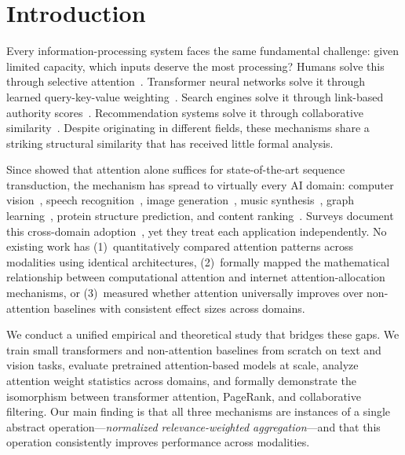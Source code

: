 \section{Introduction}
\label{sec:intro}

Every information-processing system faces the same fundamental challenge: given limited capacity, which inputs deserve the most processing? Humans solve this through selective attention~\citep{simon1971designing}. Transformer neural networks solve it through learned query-key-value weighting~\citep{vaswani2017attention}. Search engines solve it through link-based authority scores~\citep{page1999pagerank}. Recommendation systems solve it through collaborative similarity~\citep{koren2009matrix}. Despite originating in different fields, these mechanisms share a striking structural similarity that has received little formal analysis.

Since \citet{vaswani2017attention} showed that attention alone suffices for state-of-the-art sequence transduction, the mechanism has spread to virtually every AI domain: computer vision~\citep{dosovitskiy2021image}, speech recognition~\citep{radford2022whisper}, image generation~\citep{peebles2023scalable}, music synthesis~\citep{huang2018music}, graph learning~\citep{velickovic2018graph}, protein structure prediction, and content ranking~\citep{linkedin2025ranking}. Surveys document this cross-domain adoption~\citep{brauwers2022survey,guo2022attention}, yet they treat each application independently. No existing work has (1)~quantitatively compared attention patterns across modalities using identical architectures, (2)~formally mapped the mathematical relationship between computational attention and internet attention-allocation mechanisms, or (3)~measured whether attention universally improves over non-attention baselines with consistent effect sizes across domains.

We conduct a unified empirical and theoretical study that bridges these gaps. We train small transformers and non-attention baselines from scratch on text and vision tasks, evaluate pretrained attention-based models at scale, analyze attention weight statistics across domains, and formally demonstrate the isomorphism between transformer attention, PageRank, and collaborative filtering. Our main finding is that all three mechanisms are instances of a single abstract operation---\emph{normalized relevance-weighted aggregation}---and that this operation consistently improves performance across modalities.

